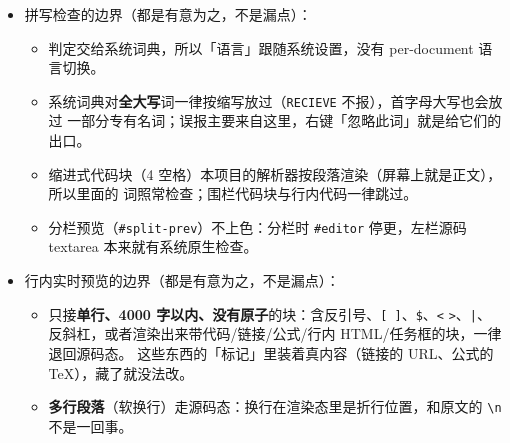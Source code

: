 \documentclass[11pt,a4paper]{ctexart}
\begin{document}
\begin{itemize}
\begin{itemize}
需要真正的公式对象得绕道 OMML 转换，暂未做。epub 里公式渲染成 HTML 上下标。
\item 导出\textbf{不会联网}抓图：\texttt{http(s)://} 图片退化为 \texttt{[图片：alt]} 占位；想内嵌就先
「右键 → 下载到本地」（或「编辑 → 下载全部远程图片」）把图落到 \texttt{assets/} 再导。
本地相对路径与 \texttt{data:} URI 正常内嵌。
\item epub 目前是\textbf{单章}（一个 \texttt{chapter.xhtml}）+ 嵌套目录；超长书稿不分卷更利于
全篇搜索，但没有分章的资源边界。
\item docx 的代码块是一段带 \texttt{w:br} 的 \texttt{CodeBlock} 段落（保留缩进与等宽），不是表格包边；
Word 里选中复制仍是一整块。
\item 表格的行列手柄只挂在主编辑区；分栏预览里的表格是只读的（改结构请回主编辑区）。
\item 表格序列化会把整张表重排成标准 GFM（列宽重新计算），不保留原作者的列宽留白。
\item 图片导出是\textbf{整页长图}（当前窗口宽度 × 全文高度），不是把每个块单独切图。
\end{itemize}
\item 拼写检查的边界（都是有意为之，不是漏点）：
\begin{itemize}
\item 判定交给系统词典，所以「语言」跟随系统设置，没有 per-document 语言切换。
\item 系统词典对\textbf{全大写}词一律按缩写放过（\texttt{RECIEVE} 不报），首字母大写也会放过
一部分专有名词；误报主要来自这里，右键「忽略此词」就是给它们的出口。
\item 缩进式代码块（4 空格）本项目的解析器按段落渲染（屏幕上就是正文），所以里面的
词照常检查；围栏代码块与行内代码一律跳过。
\item 分栏预览（\texttt{\#split-prev}）不上色：分栏时 \texttt{\#editor} 停更，左栏源码 textarea
本来就有系统原生检查。
\end{itemize}
\item 行内实时预览的边界（都是有意为之，不是漏点）：
\begin{itemize}
\item 只接\textbf{单行、4000 字以内、没有原子}的块：含反引号、\texttt{[ ]}、\texttt{\$}、\texttt{\textless{}} \texttt{\textgreater{}}、\texttt{|}、
反斜杠，或者渲染出来带代码/链接/公式/行内 HTML/任务框的块，一律退回源码态。
这些东西的「标记」里装着真内容（链接的 URL、公式的 TeX），藏了就没法改。
\item \textbf{多行段落}（软换行）走源码态：换行在渲染态里是折行位置，和原文的 \texttt{\textbackslash{}n} 不是一回事。

\end{itemize}
\end{itemize}
\end{document}
